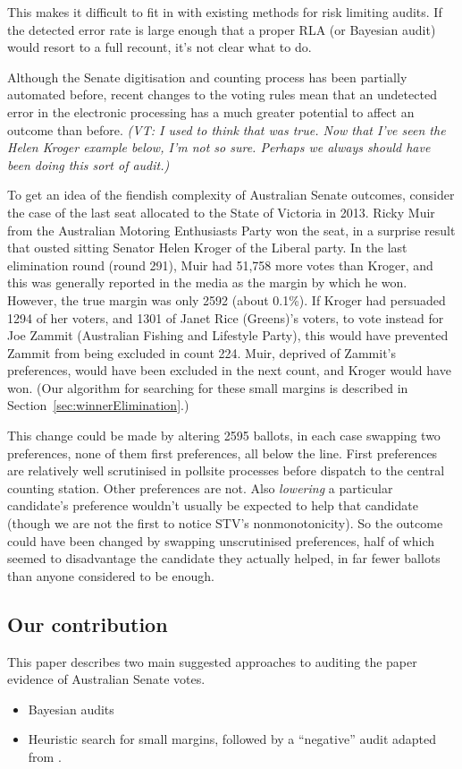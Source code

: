 \documentclass[10pt,a4paper]{article}
\newcommand{\VTNote}[1]{{\it(VT: #1)}}
\begin{document}
This makes it difficult to fit in with existing methods for risk limiting audits. If the detected error rate is large enough
that a proper RLA (or Bayesian audit) would resort to a full recount, it's not clear what to do.  

Although the Senate digitisation and counting process has been partially automated before, recent changes to the voting rules mean that an undetected error in the electronic processing has a much greater potential to affect an outcome than before.  \VTNote{I used to think that was true.  Now that I've seen the Helen Kroger example below, I'm not so sure.  Perhaps we always should have been doing this sort of audit.}

To get an idea of the fiendish complexity of Australian Senate outcomes, consider the case of the last seat allocated to the State of Victoria in 2013.  Ricky Muir from the Australian Motoring Enthusiasts Party won the seat, in a surprise result that ousted sitting Senator 
Helen Kroger of the Liberal party.  In the last elimination round (round 291), Muir had 51,758 more votes than Kroger, and this was generally reported in the media as the margin by which he won.  However, the true margin was only 2592 (about 0.1\%).  
If Kroger had persuaded 1294 of her voters, and 1301 of Janet Rice (Greens)’s voters, to  vote instead for Joe Zammit (Australian Fishing and Lifestyle Party), this would have prevented Zammit from being excluded in count 224. Muir, deprived of Zammit's preferences, would have been excluded in the next count, and Kroger would have won.   (Our algorithm for searching for these small margins is described in Section~\ref{sec:winnerElimination}.)

This change could be made by altering 2595 ballots, in each case swapping two preferences, none of them first preferences, all below the line.  First preferences are relatively well scrutinised in pollsite processes before dispatch to the central counting station.  Other preferences are not.   Also \emph{lowering} a particular candidate's preference wouldn't usually be expected to help that candidate (though we are not the first to notice STV's nonmonotonicity).  So the outcome could have been changed by swapping unscrutinised preferences, half of which seemed to disadvantage the candidate they actually helped, in far fewer ballots than anyone considered to be enough.  

\subsection{Our contribution}
This paper describes two main suggested approaches to auditing the paper evidence of Australian Senate votes.  
\begin{itemize}
	\item Bayesian audits~\cite{rivest2012bayesian} 
	\item Heuristic search for small margins, followed by a ``negative'' audit adapted from \cite{stark2014verifiable}.
\end{itemize}
\end{document}
